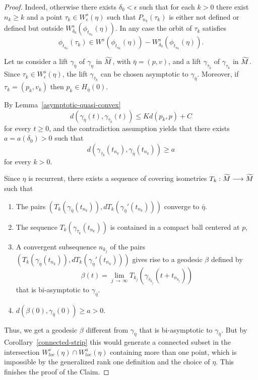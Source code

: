 \documentclass[AHL,Unicode,longabstracts,published]{cedram}
\let\oldtilde\tilde
\renewcommand*{\tilde}[1]{\mathchoice{\widetilde{#1}}{\widetilde{#1}}{\oldtilde{#1}}{\oldtilde{#1}}}
\begin{document}
\begin{proof}
Indeed, otherwise there exists $\delta_{0} < \epsilon$ such that for each $k>0$ there exist $n_{k} \geq k$ and a point $\tau_{k} \in W^{s}_{\epsilon}(\eta)$ such that $P_{n_{k}}(\tau_{k}) $ is either not defined or defined but outside $W^{s}_{\delta_{0}}(\phi_{t_{n_{k}}}(\eta))$. In any case the orbit of $\tau_{k}$ satisfies
\[
\phi_{t_{n_{k}}}(\tau_{k}) \in W^{s}\left(\phi_{t_{n_{k}}}(\eta)\right) - W^{s}_{\delta_{0}}\left(\phi_{t_{n_{k}}}(\eta)\right).
\]

Let us consider a lift $\gamma_{\bar{\eta}}$ of $\gamma_{\eta}$ in $\tilde{M}$, with $\bar{\eta}= (p,v)$, and a lift $\gamma_{\bar{\tau}_{k}}$ of $\gamma_{\tau_{k}}$ in $\tilde{M}$. Since $\tau_{k} \in W^{s}_{\epsilon}(\eta)$, the lift $\gamma_{\bar{\tau}_{k}}$ can be chosen asymptotic to $\gamma_{\bar{\eta}}$. Moreover, if $\tau_{k} = (p_{k}, v_{k})$ then $p_{k} \in H_{\bar{\eta}}(0)$.

By Lemma~\ref{asymptotic-quasi-convex}
\[
d\left(\gamma_{\bar{\eta}}(t), \gamma_{\bar{\tau}_{k}}(t)\right) \leq Kd(p_{k}, p) +C
\]
for every $t \geq 0$,
and the contradiction assumption yields that there exists $a = a(\delta_{0}) >0$ such that
\[
d\left(\gamma_{\bar{\tau}_{k}}(t_{n_{k}}), \gamma_{\bar{\eta}}(t_{n_{k}})\right) \geq a
\]
for every $k>0 $.

Since $\eta$ is recurrent, there exists a sequence of covering isometries $T_{k}: \tilde{M} \longrightarrow \tilde{M}$ such that
\begin{enumerate}
\item \label{proof-lemm8.3.1} The pairs $(T_{k}(\gamma_{\bar{\eta}}(t_{n_{k}})), dT_{k}(\gamma_{\bar{\eta}}'(t_{n_{k}})))$ converge to $\bar{\eta}$.
\item \label{proof-lemm8.3.2} The sequence $T_{k}(\gamma_{\bar{\tau}_{k}}(t_{n_{k}})) $ is contained in a compact ball centered at $p$,
\item \label{proof-lemm8.3.3} A convergent subsequence $n_{k_{j}}$ of the pairs $(T_{k}(\gamma_{\bar{\eta}}(t_{n_{k}})), dT_{k}(\gamma_{\bar{\eta}}'(t_{n_{k}})))$ gives rise to a geodesic $\beta$ defined by
\[
\beta(t) = \lim_{j\,\rightarrow\,\infty} T_{k_{j}}\left(\gamma_{\bar{\tau}_{k_{j}}}\left(t+t_{n_{k_{j}}}\right)\right)
\]
that is bi-asymptotic to $\gamma_{\bar{\eta}}$.
\item $d(\beta(0), \gamma_{\bar{\eta}}(0)) \geq a >0$.
\end{enumerate}

Thus, we get a geodesic $\beta$ different from $\gamma_{\bar{\eta}}$ that is bi-asymptotic to $\gamma_{\bar{\eta}}$. But by Corollary~\ref{connected-strip} this would generate a connected subset in the intersection $W^{s}_{loc}(\eta) \cap W^{u}_{loc}(\eta)$ containing more than one point, which is impossible by the generalized rank one definition and the choice of $\eta$. This finishes the proof of the Claim.
\end{proof}
\end{document}

